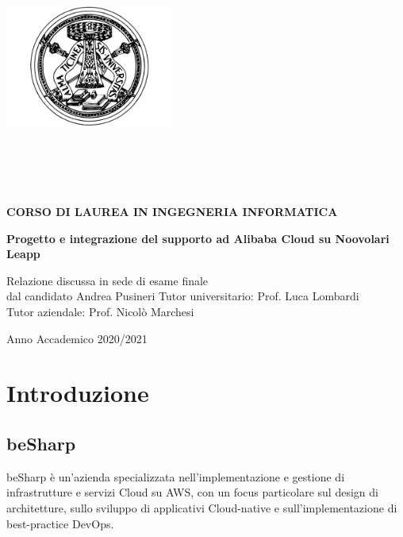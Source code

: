 \documentclass[a4paper]{article}
\begin{document}
\begin{titlepage}
    \changefontsizes[16pt]{12pt}
	\thispagestyle{empty}
	
	\begin{center}
		\vskip 1cm 
		\includegraphics[width=5.5cm]{Risorse/Logo_UNIPV.png}
		\vskip 0.5cm 
		
		\large
			\\
			\\
			\\
			\\
			
			\vskip 0.4cm 
		\large \bf
			CORSO DI LAUREA IN INGEGNERIA INFORMATICA
		
		\vskip 3cm
		\Large
			\textbf{Progetto e integrazione del supporto ad Alibaba Cloud su Noovolari Leapp}
		\vskip 4cm
		
		\large
			\begin{flushleft}
			  Relazione discussa in sede di esame finale\\dal candidato Andrea Pusineri
			  \vskip 1cm
			  Tutor universitario: Prof. Luca Lombardi\\
			  Tutor aziendale: Prof. Nicolò Marchesi
			\end{flushleft}
			
			\vfill
			Anno Accademico 2020/2021
	\end{center}
\end{titlepage}

\doublespacing
\tableofcontents
\singlespacing
\newpage

\section{Introduzione}
\subsection{beSharp}
beSharp è un'azienda specializzata nell'implementazione e gestione di infrastrutture e servizi Cloud su AWS, con un focus particolare sul design di architetture, sullo sviluppo di applicativi Cloud-native e sull’implementazione di best-practice DevOps.\cite{besharp}
\end{document}
